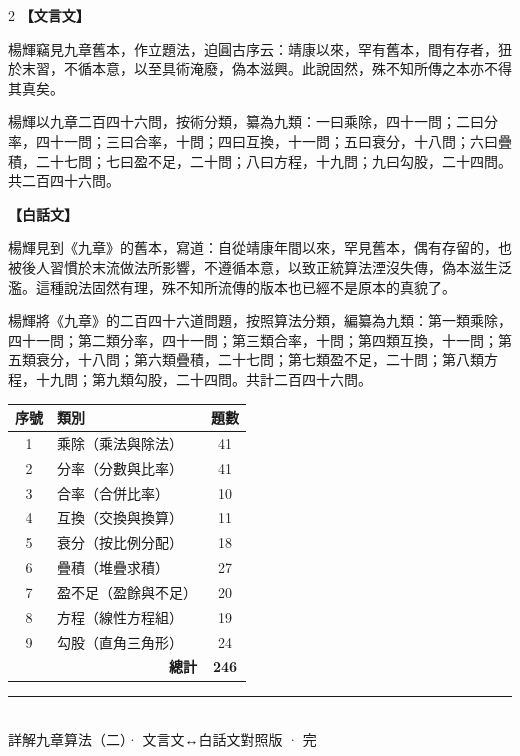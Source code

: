 \documentclass[11pt,a4paper]{article}
\newcommand{\longline}{\noindent\rule{\textwidth}{0.4pt}}
\newcommand{\zhc}{}[1]{{\CJKfamily{\CJKrmdefault}#1}}  %
\newcommand{\zhm}[1]{{\CJKfamily{\CJKrmdefault}#1}}  %
\newenvironment{prob bilingual}[1][]{%
  \begin{paracol}{2}%
  \setlength{\columnseprule}{0.4pt}%
}{%
  \end{paracol}%
  \medskip%
}
\begin{document}
\begin{paracol}{2}
\switchcolumn[0]
\noindent\textbf{\textcolor{notecolor}{\zhc{【文言文】}}}\par\smallskip
\zhc{
楊輝竊見九章舊本，作立題法，迫圓古序云：靖康以來，罕有舊本，間有存者，狃於末習，不循本意，以至具術淹廢，偽本滋興。此說固然，殊不知所傳之本亦不得其真矣。

楊輝以九章二百四十六問，按術分類，纂為九類：一曰乘除，四十一問；二曰分率，四十一問；三曰合率，十問；四曰互換，十一問；五曰衰分，十八問；六曰疊積，二十七問；七曰盈不足，二十問；八曰方程，十九問；九曰勾股，二十四問。共二百四十六問。
}

\switchcolumn[1]
\noindent\textbf{\textcolor{notecolor}{\zhm{【白話文】}}}\par\smallskip
\zhm{
楊輝見到《九章》的舊本，寫道：自從靖康年間以來，罕見舊本，偶有存留的，也被後人習慣於末流做法所影響，不遵循本意，以致正統算法湮沒失傳，偽本滋生泛濫。這種說法固然有理，殊不知所流傳的版本也已經不是原本的真貌了。

楊輝將《九章》的二百四十六道問題，按照算法分類，編纂為九類：第一類乘除，四十一問；第二類分率，四十一問；第三類合率，十問；第四類互換，十一問；第五類衰分，十八問；第六類疊積，二十七問；第七類盈不足，二十問；第八類方程，十九問；第九類勾股，二十四問。共計二百四十六問。
}
\end{paracol}

\medskip

\begin{center}
\begin{longtable}{|c|l|c|}
\hline
\textbf{序號} & \textbf{\zhc{類別}} & \textbf{\zhc{題數}} \\
\hline
1 & \zhc{乘除}（乘法與除法） & 41 \\
2 & \zhc{分率}（分數與比率） & 41 \\
3 & \zhc{合率}（合併比率） & 10 \\
4 & \zhc{互換}（交換與換算） & 11 \\
5 & \zhc{衰分}（按比例分配） & 18 \\
6 & \zhc{疊積}（堆疊求積） & 27 \\
7 & \zhc{盈不足}（盈餘與不足） & 20 \\
8 & \zhc{方程}（線性方程組） & 19 \\
9 & \zhc{勾股}（直角三角形） & 24 \\
\hline
\multicolumn{2}{|r|}{\textbf{\zhc{總計}}} & \textbf{246} \\
\hline
\end{longtable}
\end{center}

\vspace{2cm}
\begin{center}
\longline\\[0.5cm]
{\zhc{\small 詳解九章算法（二）· 文言文↔白話文對照版 · 完}}
\end{center}
\end{document}
